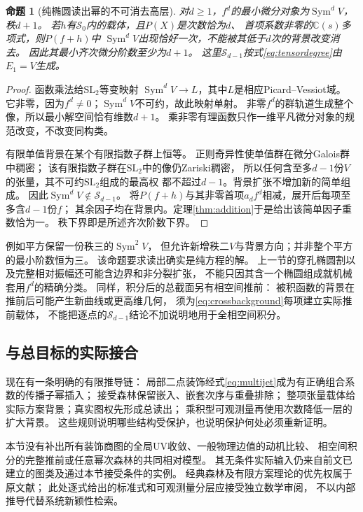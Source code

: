 \documentclass[11pt,a4paper]{ctexart}
\theoremstyle{cnplain}\newtheorem{theorem}{定理}[section]
\newtheorem{proposition}[theorem]{命题}
\theoremstyle{definition}\newtheorem{definition}[theorem]{定义}
\theoremstyle{remark}\newtheorem{remark}[theorem]{注}
\begin{document}
\begin{proposition}[纯椭圆读出幂的不可消去高层]\label{prop:elliptichighlayer}
对$d\ge1$，$f^d$的最小微分对象为$\operatorname{Sym}^d V$，秩$d+1$。
若$h$有$\mathcal S_0$内的载体，且$P(X)$是次数恰为$d$、
首项系数非零的$\mathbb C(s)$多项式，则$P(f+h)$中
$\operatorname{Sym}^d V$出现恰好一次，不能被其低于$d$次的背景改变消去。
因此其最小齐次微分阶数至少为$d+1$。
这里$\mathcal S_{d-1}$按式\eqref{eq:tensordegree}由$E_1=V$生成。
\end{proposition}
\begin{proof}
函数乘法给$\mathrm{SL}_2$等变映射
$\operatorname{Sym}^d V\to L$，其中$L$是相应Picard--Vessiot域。
它非零，因为$f^d\ne0$；$\operatorname{Sym}^d V$不可约，故此映射单射。
非零$f^d$的群轨道生成整个像，所以最小解空间恰有维数$d+1$。
乘非零有理函数只作一维平凡微分对象的规范改变，不改变同构类。

有限单值背景在某个有限指数子群上恒等。
正则奇异性使单值群在微分Galois群中稠密\cite{Singer}；
该有限指数子群在$\mathrm{SL}_2$中的像仍Zariski稠密，
所以任何含至多$d-1$份$V$的张量，其不可约$\mathrm{SL}_2$组成的最高权
都不超过$d-1$。背景扩张不增加新的简单组成。
因此$\operatorname{Sym}^d V\notin\mathcal S_{d-1}$。
将$P(f+h)$与其非零首项$a_df^d$相减，展开后每项至多含$d-1$份$f$；
其余因子均在背景内。定理\ref{thm:addition}于是给出该简单因子重数恰为一。
秩下界即是所述齐次阶数下界。
\end{proof}

例如平方保留一份秩三的$\operatorname{Sym}^2 V$，
但允许新增秩二$V$与背景方向；并非整个平方的最小阶数恒为三。
该命题要求读出确实是纯方程的解。
上一节的穿孔椭圆割以及完整相对振幅还可能含边界和非分裂扩张，
不能只因其含一个椭圆组成就机械套用$f^d$的精确分类。
同样，积分后的总截面另有相空间推前：
被积函数的背景在推前后可能产生新曲线或更高维几何，
须为\eqref{eq:crossbackground}每项建立实际推前载体，
不能把逐点的$\mathcal S_{d-1}$结论不加说明地用于全相空间积分。

\subsection{与总目标的实际接合}

现在有一条明确的有限推导链：
局部二点装饰经式\eqref{eq:multijet}成为有正确组合系数的传播子幂插入；
接受森林保留嵌入、嵌套次序与重叠排除；
整项张量载体给实际方案背景；真实图权先形成总读出；
乘积型可观测量再使用次数降低一层的扩大背景。
这些规则说明哪些结构受保护，也说明保护何处必须重新证明。

本节没有补出所有装饰商图的全局UV收敛、一般物理边值的动机比较、
相空间积分的完整推前或任意幂次森林的共同相对模型。
其无条件实际输入仍来自前文已建立的图类及通过本节接受条件的实例。
经典森林及有限方案理论的优先权属于原文献；
此处逐式给出的标准式和可观测量分层应接受独立数学审阅，
不以内部推导代替系统新颖性检索。
\end{document}
